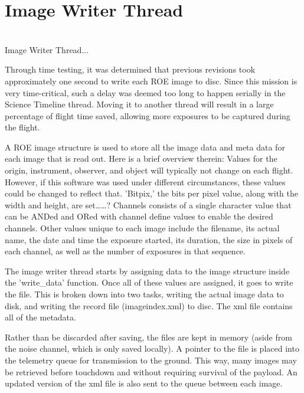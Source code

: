 %
\section{Image Writer Thread}
\hrulefill
\\
Image Writer Thread... 

Through time testing, it was determined that previous revisions took approximately one second to write each ROE image to disc. Since this mission is very time-critical, such a delay was deemed too long to happen serially in the Science Timeline thread. Moving it to another thread will result in a large percentage of flight time saved, allowing more exposures to be captured during the flight.

A ROE image structure is used to store all the image data and meta data for each image that is read out. Here is a brief overview therein:
Values for the origin, instrument, observer, and object will typically not change on each flight. However, if this software was used under different circumstances, these values could be changed to reflect that. 'Bitpix,' the bits per pixel value, along with the width and height, are set……? Channels consists of a single character value that can be ANDed and ORed with channel define values to enable the desired channels. Other values unique to each image include the filename, its actual name, the date and time the exposure started, its duration, the size in pixels of each channel, as well as the number of exposures in that sequence.  

The image writer thread starts by assigning data to the image structure inside the 'write\_data' function. Once all of these values are assigned, it goes to write the file. This is broken down into two tasks, writing the actual image data to disk, and writing the record file (imageindex.xml) to disc. The xml file contains all of the metadata. 


Rather than be discarded after saving, the files are kept in memory (aside from the noise channel, which is only saved locally). A pointer to the file is placed into the telemetry queue for transmission to the ground. This way, many images may be retrieved before touchdown and without requiring survival of the payload. An updated version of the xml file is also sent to the queue between each image.

